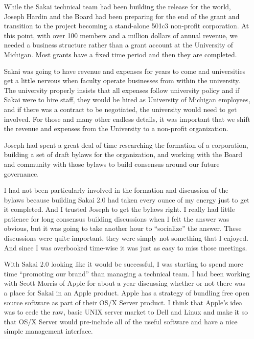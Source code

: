 \documentclass[12pt]{book}
\begin{document}
While the Sakai technical team had been building the release
for the world, Joseph Hardin and the Board had been preparing
for the end of the grant and transition to the project becoming
a stand-alone 501c3 non-profit corporation.   At this point,
with over 100 members and a million dollars of annual revenue,
we needed a business structure rather than a grant account
at the University of Michigan.  Most grants have a fixed
time period and then they are completed.

Sakai was going to have revenue and expenses for years to
come and universities get a little nervous when faculty
operate businesses from within the university.  The
university properly insists that all expenses follow university
policy and if Sakai were to hire staff, they would be hired
as University of Michigan employees, and if there was a contract
to be negotiated, the university would need to get involved.
For those and many other endless details, it was important
that we shift the revenue and expenses from the University
to a non-profit organization.

Joseph had spent a great deal of time researching the formation
of a corporation, building a set of draft bylaws for the
organization, and working with the Board and community with
those bylaws to build consensus around our future governance.

I had not been particularly involved in the formation and
discussion of the bylaws because building Sakai 2.0 had taken every
ounce of my energy just to get it completed.  And I trusted
Joseph to get the bylaws right.  I really had little patience
for long consensus building discussions when I felt the
answer was obvious, but it was going to take
another hour to ``socialize'' the answer.  These
discussions were quite important, they were simply not
something that I enjoyed.  And since I was overbooked time-wise
it was just as easy to miss those meetings.

With Sakai 2.0 looking like it would be successful, I was
starting to spend more time ``promoting our brand'' than
managing a technical team.   I had been working with Scott
Morris of Apple for about a year discussing
whether or not there was a place for Sakai in an Apple product.
Apple has a strategy of bundling free open source software
as part of their OS/X Server product.  I think that Apple's
idea was to cede the raw, basic UNIX server market to Dell and Linux
and make it so that OS/X Server would pre-include all of
the useful software and have a nice simple management
interface.
\end{document}
